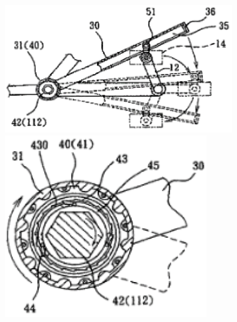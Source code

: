 \documentclass[10pt, a4paper]{article}
\begin{document}
{\begin{figure}[!h]
\begin{minipage}{0.49\textwidth}
\begin{minipage}{0.49\textwidth}
					\caption{}
				\end{minipage}
				\begin{minipage}{0.49\textwidth}
					\centering
					\includegraphics[width=0.9\textwidth]{figures/fig6.png}
					\caption{}
				\end{minipage}
				\begin{minipage}{0.49\textwidth}
					\centering
					\includegraphics[width=0.8\textwidth]{figures/fig7.png}
					\caption{}
				\end{minipage}
			\end{minipage}
		\end{figure}
	
		\clearpage\newpage
		
		
		
}
\end{document}

